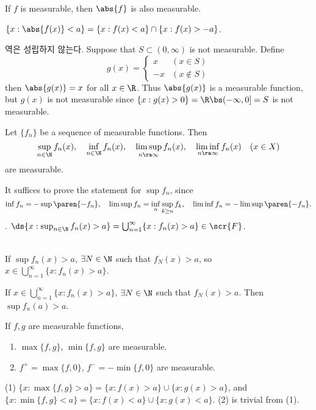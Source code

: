  If \(f\) is measurable, then \(\abs{f}\) is also measurable.

\pf \(\{x : \abs{f(x)} < a\} = \{x : f(x) < a\} \cap \{x : f(x) > -a\}\).

\rmk 역은 성립하지 않는다. Suppose that \(S \subset (0, \infty)\) is not measurable. Define
\[
    g(x) = \begin{cases}
        x & (x \in S) \\ -x & (x \notin S)
    \end{cases}
\]
then \(\abs{g(x)} = x\) for all \(x \in \R\). Thus \(\abs{g(x)}\) is a measurable function, but \(g(x)\) is not measurable since \(\{x : g(x) > 0\} = \R \bs (-\infty, 0] = S\) is not measurable.

\medskip

 Let \(\{f_n\}\) be a sequence of measurable functions. Then
\[
    \sup_{n\in \N} f_n(x), \quad \inf_{n\in \N} f_n(x), \quad \limsup_{n \ra \infty} f_n(x), \quad \liminf_{n \ra \infty} f_n(x) \quad (x\in X)
\]
are measurable.

\pf It suffices to prove the statement for \(\sup f_n\), since
\[
    \inf f_n = -\sup\paren{-f_n}, \quad \limsup f_n = \inf_n \sup_{k\geq n} f_k, \quad \liminf f_n = -\limsup\paren{-f_n}.
\]
\quad \claim. \(\ds \{x : \sup_{n\in\N} f_n(x) > a\} =  \bigcup_{n=1}^{\infty} \{x : f_n(x) > a\} \in \scr{F}\).

\quad \pf \\
\note{\(\subset\)} If \(\sup f_n(x) > a\), \(\exists N \in \N\) such that \(f_N(x) > a\), so \(x \in \bigcup_{n=1}^{\infty} \{x : f_n(x) > a\}\).

\note{\(\supseteq\)} If \(x \in \bigcup_{n=1}^{\infty} \{x : f_n(x) > a\}\), \(\exists N \in \N\) such that \(f_N(x) > a\). Then \(\sup f_n(a) > a\).

\medskip

\cor If \(f, g\) are measurable functions,
\begin{enumerate}
    \item \(\max\{f, g\}\), \(\min\{f, g\}\) are measurable.
    \item \(f^+ = \max\{f, 0\}\), \(f^- = -\min\{f, 0\}\) are measurable.
\end{enumerate}

\pf (1) \(\{x : \max\{f, g\} > a\} = \{x : f(x) > a\} \cup \{x : g(x) > a\}\), and \(\{x : \min\{f, g\} < a\} = \{x : f(x) < a\} \cup \{x : g(x) < a\}\). (2) is trivial from (1).

\medskip

